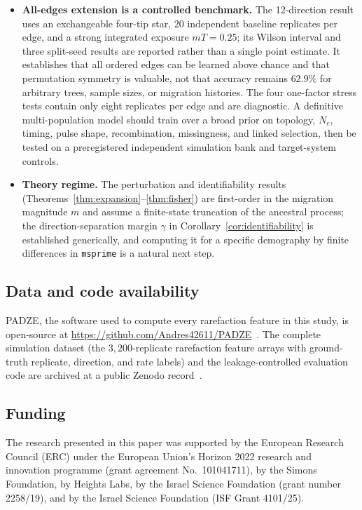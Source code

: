 \documentclass[11pt]{article}
\theoremstyle{plain}
\theoremstyle{definition}
\theoremstyle{remark}
\begin{document}
\begin{itemize}
from the simulation calibration curve.
\item \textbf{All-edges extension is a controlled benchmark.} The 12-direction result uses an
exchangeable four-tip star, $20$ independent baseline replicates per edge, and a strong integrated
exposure $mT=0.25$; its Wilson interval and three split-seed results are reported rather than a
single point estimate. It establishes that all ordered edges can be learned above chance and that
permutation symmetry is valuable, not that accuracy remains $62.9\%$ for arbitrary trees, sample
sizes, or migration histories. The four one-factor stress tests contain only eight replicates per
edge and are diagnostic. A definitive multi-population model should train over a broad prior on
topology, $N_e$, timing, pulse shape, recombination, missingness, and linked selection, then be
tested on a preregistered independent simulation bank and target-system controls.
\item \textbf{Theory regime.} The perturbation and identifiability results
(Theorems~\ref{thm:expansion}--\ref{thm:fisher}) are first-order in the migration magnitude $m$ and
assume a finite-state truncation of the ancestral process; the direction-separation margin $\gamma$
in Corollary~\ref{cor:identifiability} is established generically, and computing it for a specific
demography by finite differences in \texttt{msprime} is a natural next step.
\end{itemize}

\subsection*{Data and code availability}
\textsc{PADZE}, the software used to compute every rarefaction feature in this study, is
open-source at \url{https://github.com/Andres42611/PADZE}~\citep{padze2026}. The complete
simulation dataset (the $3{,}200$-replicate rarefaction feature arrays with ground-truth
replicate, direction, and rate labels) and the leakage-controlled evaluation code are
archived at a public Zenodo record~\citep{delcastillo2026data}.

\subsection*{Funding}
The research presented in this paper was supported by the European Research Council (ERC) under
the European Union's Horizon 2022 research and innovation programme (grant agreement No.\ 101041711),
by the Simons Foundation, by Heights Labs, by the Israel Science Foundation (grant number 2258/19),
and by the Israel Science Foundation (ISF Grant 4101/25).
\end{document}
